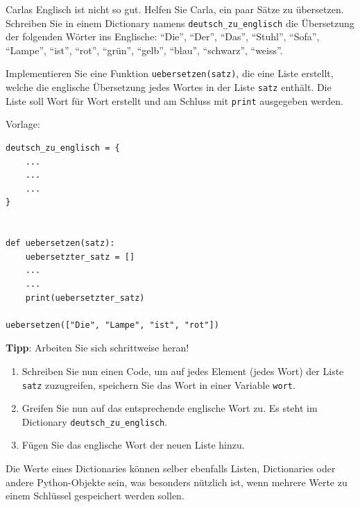 \begin{myexercise}
	Carlas Englisch ist nicht so gut. Helfen Sie Carla, ein paar Sätze zu übersetzen. Schreiben Sie in einem Dictionary namens \lstinline|deutsch_zu_englisch| die Übersetzung der folgenden Wörter ins Englische: \enquote{Die}, \enquote{Der}, \enquote{Das}, \enquote{Stuhl}, \enquote{Sofa}, \enquote{Lampe}, \enquote{ist}, \enquote{rot}, \enquote{grün}, \enquote{gelb}, \enquote{blau}, \enquote{schwarz}, \enquote{weiss}.

	Implementieren Sie eine Funktion \lstinline|uebersetzen(satz)|, die eine Liste erstellt, welche die englische Übersetzung jedes Wortes in der Liste \lstinline|satz| enthält. Die Liste soll Wort für Wort erstellt und am Schluss mit \lstinline|print| ausgegeben werden.

	Vorlage:
	\begin{lstlisting}
deutsch_zu_englisch = {
    ...
    ...
    ...
}


def uebersetzen(satz):
    uebersetzter_satz = []
    ...
    ...
    print(uebersetzter_satz)

uebersetzen(["Die", "Lampe", "ist", "rot"])
\end{lstlisting}

	\textbf{Tipp}: Arbeiten Sie sich schrittweise heran! %

	\begin{enumerate}
		\item Schreiben Sie nun einen Code, um auf jedes Element (jedes Wort) der Liste \lstinline|satz| zuzugreifen, speichern Sie das Wort in einer Variable \lstinline|wort|.
		\item Greifen Sie nun auf das entsprechende englische Wort zu. Es steht im Dictionary \lstinline|deutsch_zu_englisch|.
		\item Fügen Sie das englische Wort der neuen Liste hinzu.
	\end{enumerate}
	\begin{myanswer}
		
	\end{myanswer}
\end{myexercise}

Die Werte eines Dictionaries können selber ebenfalls Listen, Dictionaries oder andere Python-Objekte sein, was besonders nützlich ist, wenn mehrere Werte zu einem Schlüssel gespeichert werden sollen.

